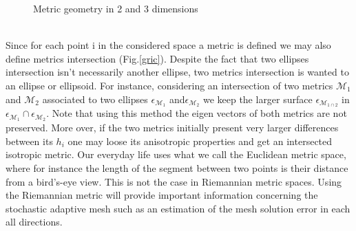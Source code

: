 \documentclass[11pt, a4paper, English]{report}
\begin{document}
\begin{appendix}
\begin{figure}[h!]
    \caption{Metric geometry in 2 and 3 dimensions \cite{Fredo}}
    \label{geometric}
\end{figure}\\
Since for each point i in the considered space a metric is defined we may also define metrics intersection (Fig.\ref{gric}). Despite the fact that two ellipses intersection isn't necessarily another ellipse, two metrics intersection is wanted to an ellipse or ellipsoid. For instance, considering an intersection of two metrics $\mathcal{M}_1$ and $\mathcal{M}_2$ associated to two ellipses $\epsilon_{\mathcal{M}_1}$ and$\epsilon_{\mathcal{M}_2}$ we keep the larger surface $\epsilon_{\mathcal{M}_{1\cap2}}$   in $ \epsilon_{\mathcal{M}_1}\cap \epsilon_{\mathcal{M}_2}$. Note that using this method the eigen vectors of both metrics are not preserved. More over, if the two metrics initially present very larger differences between its $h_i$ one may loose its anisotropic properties and get an intersected isotropic metric. Our everyday life uses what we call the Euclidean metric space, where for instance the length of the segment between two points is their distance from a bird's-eye view. This is not the case in Riemannian metric spaces. Using the Riemannian metric will provide important information concerning the stochastic adaptive mesh such as an estimation of the mesh solution error in each all directions. 


\end{appendix}
\end{document}
